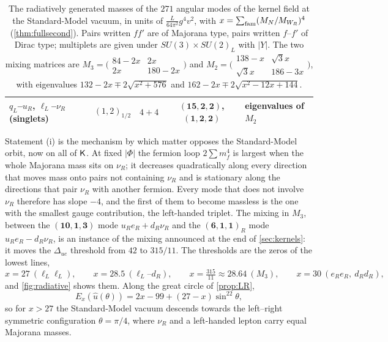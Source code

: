 \begin{table}[t]
\begin{tabular}{@{}llccl@{}}
$q_L$--$u_R$, $\ell_L$--$\nu_R$ (singlets) & $(1,2)_{1/2}$ & $4+4$ & $(\mathbf{15},\mathbf2,\mathbf2)$, $(\mathbf1,\mathbf2,\mathbf2)$ & eigenvalues of $M_2$\\
\bottomrule
\end{tabular}
\caption{The radiatively generated masses of the $271$ angular modes of the kernel field at the Standard-Model vacuum, in units of $\tfrac L{64\pi^2}g^4v^2$, with
$x=\sum_{\rm fam}(M_N/M_{W_R})^4$ (\cref{thm:fullsecond}). Pairs written $ff'$ are of Majorana type, pairs written $f$--$f'$ of Dirac type; multiplets are given
under $SU(3)\times SU(2)_L$ with $|Y|$. The two mixing matrices are
$M_3=\bigl(\begin{smallmatrix}84-2x&2x\\2x&180-2x\end{smallmatrix}\bigr)$ and $M_2=\bigl(\begin{smallmatrix}138-x&\sqrt3x\\\sqrt3x&186-3x\end{smallmatrix}\bigr)$, with eigenvalues
$132-2x\mp2\sqrt{x^2+576}$ and $162-2x\mp2\sqrt{x^2-12x+144}$.}
\label{tab:271}
\end{table}

Statement (i) is the mechanism by which matter opposes the Standard-Model orbit, now on all of $\mathsf K$. At fixed $|\Phi|$ the fermion loop $2\sum m_f^4$ is largest when the
whole Majorana mass sits on $\nu_R$; it decreases quadratically along every direction that moves mass onto pairs not containing $\nu_R$ and is stationary along the
directions that pair $\nu_R$ with another fermion. Every mode that does not involve $\nu_R$ therefore has slope $-4$, and the first of them to become massless is the one
with the smallest gauge contribution, the left-handed triplet. The mixing in $M_3$, between the $(\mathbf{10},\mathbf1,\mathbf3)$ mode $u_Re_R+d_R\nu_R$ and the $(\mathbf6,\mathbf1,\mathbf1)_R$
mode $u_Re_R-d_R\nu_R$, is an instance of the mixing announced at the end of \cref{sec:kernels}: it moves the $\Delta_{ue}$ threshold from $42$ to $315/11$. The
thresholds are the zeros of the lowest lines,
\[
x=27\ (\ell_L\ell_L),\qquad x=28.5\ (\ell_L\text{--}d_R),\qquad x=\tfrac{315}{11}\approx28.64\ (M_3),\qquad x=30\ (e_Re_R,\ d_Rd_R),
\]
and \cref{fig:radiative} shows them. Along the great circle of \cref{prop:LR},
\[
E_x(\hat u(\theta))=2x-99+(27-x)\sin^22\theta ,
\]
so for $x>27$ the Standard-Model vacuum descends towards the left--right symmetric configuration $\theta=\pi/4$, where $\nu_R$ and a left-handed lepton carry equal
Majorana masses.

